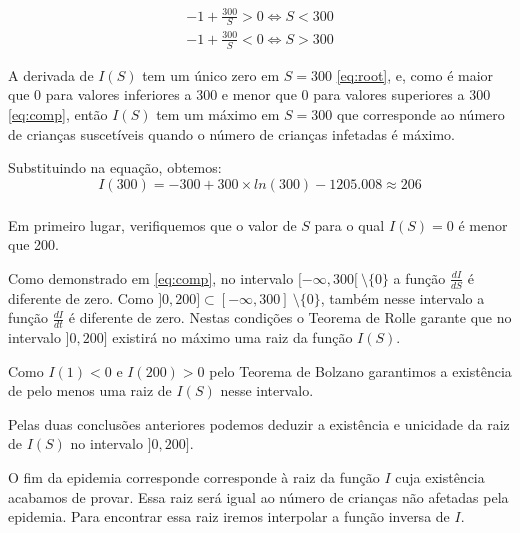\documentclass[portuguese, a4paper]{article}
\begin{document}
		\begin{equation}
		\begin{split}
			\label{eq:comp}
			 -1 + \frac{300}{S} > 0 \Leftrightarrow S < 300 \\
			 -1 + \frac{300}{S} < 0 \Leftrightarrow S > 300
		\end{split}
		\end{equation}

		\par
		A derivada de $I(S)$ tem um único zero em $S = 300$ \eqref{eq:root},
		e, como é maior que 0 para valores inferiores a 300 e menor que 0
		para valores superiores a 300 \eqref{eq:comp}, então $I(S)$ tem um máximo
		em $S = 300$ que corresponde ao número de crianças suscetíveis
		quando o número de crianças infetadas é máximo.

		\par
		Substituindo na equação, obtemos:
		\begin{equation}
			I(300) = -300 + 300 \times ln(300) - 1205.008 \approx 206
		\end{equation}

		\subsubsection{} \label{sec:III.2b)}
		\par
		Em primeiro lugar, verifiquemos que o valor de $S$ para o qual $I(S) = 0$ é menor que 200.

		\par
		Como demonstrado em \eqref{eq:comp}, no intervalo
		$[-\infty,300[~\setminus\{0\}$ a função $\frac{dI}{dS}$ é diferente de
		zero. Como $]0,200] \subset [-\infty,300]~\setminus\{0\}$, também nesse
		intervalo a função $\frac{dI}{dt}$ é diferente de zero. Nestas condições
		o Teorema de Rolle garante que no intervalo $]0,200]$ existirá no máximo
		uma raiz da função $I(S)$.

		\par
		Como $I(1) < 0$ e $I(200) > 0$ pelo Teorema de Bolzano garantimos a
		existência de pelo menos uma raiz de $I(S)$ nesse intervalo.

		\par
		Pelas duas conclusões anteriores podemos deduzir a existência e
		unicidade da raiz de $I(S)$ no intervalo $]0, 200]$.

		\par \null \par
		O fim da epidemia corresponde corresponde à raiz da função $I$ cuja
		existência acabamos de provar. Essa raiz será igual ao número de
		crianças não afetadas pela epidemia. Para encontrar essa raiz iremos
		interpolar a função inversa de $I$.
\end{document}
